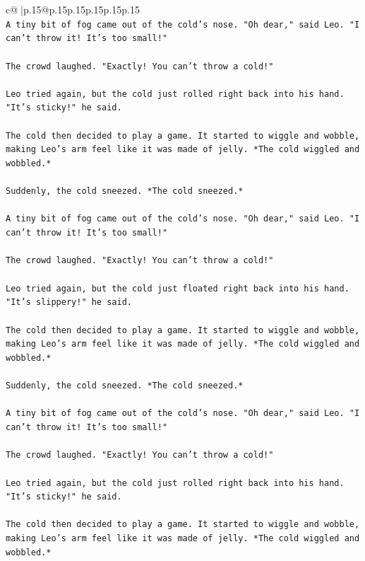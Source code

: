 \documentclass{article}
\begin{document}
{\begin{supertabular}{c@{$\;$}|p{.15\linewidth}@{}p{.15\linewidth}p{.15\linewidth}p{.15\linewidth}p{.15\linewidth}p{.15\linewidth}}
{{{\\ 
\texttt{A tiny bit of fog came out of the cold's nose. "Oh dear," said Leo. "I can't throw it! It's too small!"} \\
\\ 
\texttt{The crowd laughed. "Exactly! You can't throw a cold!"} \\
\\ 
\texttt{Leo tried again, but the cold just rolled right back into his hand. "It's sticky!" he said.} \\
\\ 
\texttt{The cold then decided to play a game. It started to wiggle and wobble, making Leo's arm feel like it was made of jelly. *The cold wiggled and wobbled.*} \\
\\ 
\texttt{Suddenly, the cold sneezed. *The cold sneezed.*} \\
\\ 
\texttt{A tiny bit of fog came out of the cold's nose. "Oh dear," said Leo. "I can't throw it! It's too small!"} \\
\\ 
\texttt{The crowd laughed. "Exactly! You can't throw a cold!"} \\
\\ 
\texttt{Leo tried again, but the cold just floated right back into his hand. "It's slippery!" he said.} \\
\\ 
\texttt{The cold then decided to play a game. It started to wiggle and wobble, making Leo's arm feel like it was made of jelly. *The cold wiggled and wobbled.*} \\
\\ 
\texttt{Suddenly, the cold sneezed. *The cold sneezed.*} \\
\\ 
\texttt{A tiny bit of fog came out of the cold's nose. "Oh dear," said Leo. "I can't throw it! It's too small!"} \\
\\ 
\texttt{The crowd laughed. "Exactly! You can't throw a cold!"} \\
\\ 
\texttt{Leo tried again, but the cold just rolled right back into his hand. "It's sticky!" he said.} \\
\\ 
\texttt{The cold then decided to play a game. It started to wiggle and wobble, making Leo's arm feel like it was made of jelly. *The cold wiggled and wobbled.*} \\
}}}
\end{supertabular}}
\end{document}
